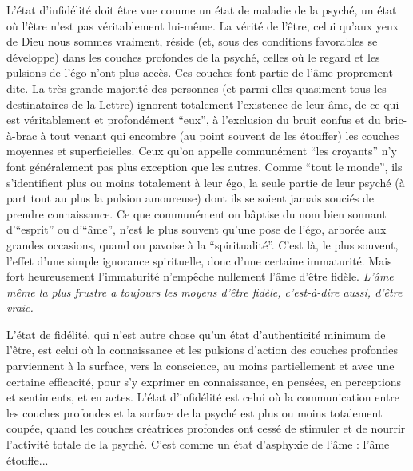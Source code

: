 L'état d'infidélité doit être vue comme un état de maladie de la psyché, un état où l'être n'est pas véritablement lui-même. La vérité de l'être, celui qu'aux yeux de Dieu nous sommes vraiment, réside (et, sous des conditions favorables se développe) dans les couches profondes de la psyché, celles où le regard et les pulsions de l'égo n'ont plus accès. Ces couches font partie de l'âme proprement dite. La très grande majorité des personnes (et parmi elles quasiment tous les destinataires de la Lettre) ignorent totalement l'existence de leur âme, de ce qui est véritablement et profondément ``eux'', à l'exclusion du bruit confus et du bric-à-brac à tout venant qui encombre (au point souvent de les étouffer) les couches moyennes et superficielles. Ceux qu'on appelle communément ``les croyants'' n'y font généralement pas plus exception que les autres. Comme ``tout le monde'', ils s'identifient plus ou moins totalement à leur égo, la seule partie de leur psyché (à part tout au plus la pulsion amoureuse) dont ils se soient jamais souciés de prendre connaissance. Ce que communément on bâptise du nom bien sonnant d'``esprit'' ou d'``âme'', n'est le plus souvent qu'une pose de l'égo, arborée aux grandes occasions, quand on pavoise à la ``spiritualité''. C'est là, le plus souvent, l'effet d'une simple ignorance spirituelle, donc d'une certaine immaturité. Mais fort heureusement l'immaturité n'empêche nullement l'âme d'être fidèle. \textit{L'âme même la plus frustre a toujours les moyens d'être fidèle, c'est-à-dire aussi, d'être vraie.}

L'état de fidélité, qui n'est autre chose qu'un état d'authenticité minimum de l'être, est celui où la connaissance et les pulsions d'action des couches profondes parviennent à la surface, vers la conscience, au moins partiellement et avec une certaine efficacité, pour s'y exprimer en connaissance, en pensées, en perceptions et sentiments, et en actes. L'état d'infidélité est celui où la communication entre les couches profondes et la surface de la psyché est plus ou moins totalement coupée, quand les couches créatrices profondes ont cessé de stimuler et de nourrir l'activité totale de la psyché. C'est comme un état d'asphyxie de l'âme : l'âme étouffe...

